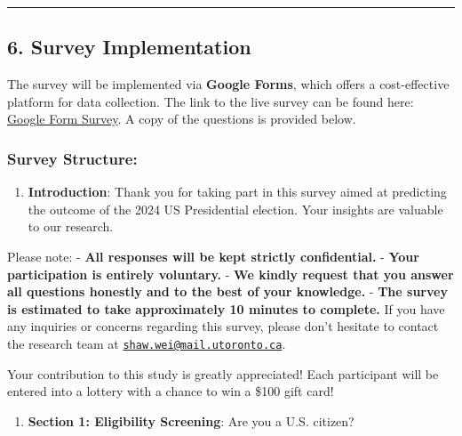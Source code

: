 \documentclass[
  letterpaper,
  DIV=11,
  numbers=noendperiod]{scrartcl}
\providecommand{\tightlist}{%
  \setlength{\itemsep}{0pt}\setlength{\parskip}{0pt}}\usepackage{longtable,booktabs,array}
\begin{document}
\begin{center}\rule{0.5\linewidth}{0.5pt}\end{center}

\subsection{\texorpdfstring{\textbf{6. Survey
Implementation}}{6. Survey Implementation}}\label{survey-implementation}

The survey will be implemented via \textbf{Google Forms}, which offers a
cost-effective platform for data collection. The link to the live survey
can be found here: \href{https://forms.gle/RC1464SvLvtoAYdv6}{Google
Form Survey}. A copy of the questions is provided below.

\subsubsection{\texorpdfstring{\textbf{Survey
Structure}:}{Survey Structure:}}\label{survey-structure}

\begin{enumerate}
\def\labelenumi{\arabic{enumi}.}
\tightlist
\item
  \textbf{Introduction}: Thank you for taking part in this survey aimed
  at predicting the outcome of the 2024 US Presidential election. Your
  insights are valuable to our research.
\end{enumerate}

Please note: - \textbf{All responses will be kept strictly
confidential.} - \textbf{Your participation is entirely voluntary.} -
\textbf{We kindly request that you answer all questions honestly and to
the best of your knowledge.} - \textbf{The survey is estimated to take
approximately 10 minutes to complete.} If you have any inquiries or
concerns regarding this survey, please don't hesitate to contact the
research team at
\href{mailto:shaw.wei@mail.utoronto.ca}{\nolinkurl{shaw.wei@mail.utoronto.ca}}.

Your contribution to this study is greatly appreciated! Each participant
will be entered into a lottery with a chance to win a \$100 gift card!

\begin{enumerate}
\def\labelenumi{\arabic{enumi}.}
\setcounter{enumi}{1}
\tightlist
\item
  \textbf{Section 1: Eligibility Screening}: Are you a U.S. citizen?
\end{enumerate}
\end{document}
